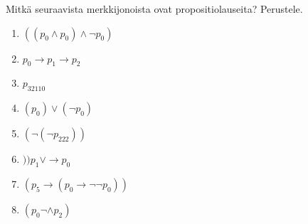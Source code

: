 \documentclass[12pt,a4paper]{article}
\begin{document}
\begin{exercise}
Mitkä seuraavista merkkijonoista ovat propositiolauseita? Perustele.
\begin{enumerate}[label=\alph*), nosep]
\item \(((p_0 \land p_0) \land \neg p_0)\)
\item \(p_0 \rightarrow p_1 \rightarrow p_2\)
\item \(p_{32110}\)
\item \((p_0) \lor (\neg p_0)\)
\item \((\neg(\neg p_{222}))\)
\item \())p_1 \lor \rightarrow p_0\)
\item \((p_5 \rightarrow (p_0 \rightarrow \neg \neg p_0))\)
\item \((p_0 \neg \land p_2)\)
\end{enumerate}
\end{exercise}
\end{document}
